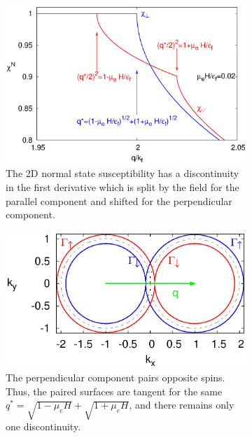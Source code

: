 \documentclass[usletter,aps,prb,10pt,amssymb,amsmath,twocolumn]{revtex4-1}
\begin{document}
\begin{figure}
\caption{Normal state susceptibility}\label{fig:norm}
        \centering
        \begin{subfigure}[b]{0.45\textwidth}

                \includegraphics[width=\textwidth]{./figures/chiNormal.eps}
                \caption{The 2D normal state susceptibility has a discontinuity in the first derivative which is split by the field for the parallel component and shifted for the perpendicular component.}
        \end{subfigure}
         \begin{subfigure}[b]{0.23\textwidth}

                \includegraphics[width=\textwidth]{./figures/SpinPairingxx.eps}
                \caption{The perpendicular component pairs opposite spins. Thus, the paired surfaces are tangent for the same $q^* =\sqrt{1-\mu_e H}+\sqrt{1+\mu_e H}$, and there remains only one discontinuity. }
        \end{subfigure}
         \begin{subfigure}[b]{0.23\textwidth}


\end{subfigure}
\end{figure}
\end{document}

